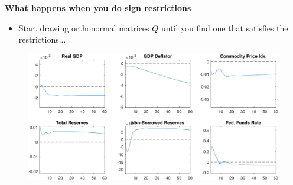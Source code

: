 \begin{frame}
\begin{itemize}
\begin{minipage}[b]{.9\textwidth}
\end{minipage}
\end{itemize}
\end{frame}


\begin{frame}
{\textbf{What happens when you do sign restrictions }}

\begin{itemize}
\item Start drawing orthonormal matrices $Q$ until you find one that
satisfies the restrictions...
\end{itemize}

\begin{figure}[h]
\vspace{.3cm}\includegraphics[width=.8\textwidth]{Uhlig_Replication_1rot.pdf}
\end{figure}
\end{frame}


